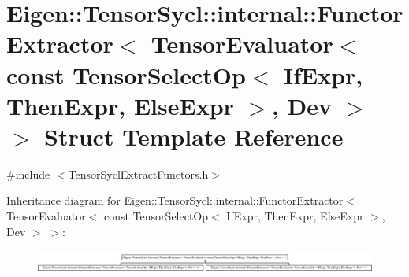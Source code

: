 \hypertarget{struct_eigen_1_1_tensor_sycl_1_1internal_1_1_functor_extractor_3_01_tensor_evaluator_3_01const_08443a240f6166215dcd0107fd174ad7c}{}\section{Eigen\+:\+:Tensor\+Sycl\+:\+:internal\+:\+:Functor\+Extractor$<$ Tensor\+Evaluator$<$ const Tensor\+Select\+Op$<$ If\+Expr, Then\+Expr, Else\+Expr $>$, Dev $>$ $>$ Struct Template Reference}
\label{struct_eigen_1_1_tensor_sycl_1_1internal_1_1_functor_extractor_3_01_tensor_evaluator_3_01const_08443a240f6166215dcd0107fd174ad7c}


{\ttfamily \#include $<$Tensor\+Sycl\+Extract\+Functors.\+h$>$}

Inheritance diagram for Eigen\+:\+:Tensor\+Sycl\+:\+:internal\+:\+:Functor\+Extractor$<$ Tensor\+Evaluator$<$ const Tensor\+Select\+Op$<$ If\+Expr, Then\+Expr, Else\+Expr $>$, Dev $>$ $>$\+:\begin{figure}[H]
\begin{center}
\leavevmode
\includegraphics[height=0.747664cm]{struct_eigen_1_1_tensor_sycl_1_1internal_1_1_functor_extractor_3_01_tensor_evaluator_3_01const_08443a240f6166215dcd0107fd174ad7c}
\end{center}
\end{figure}
